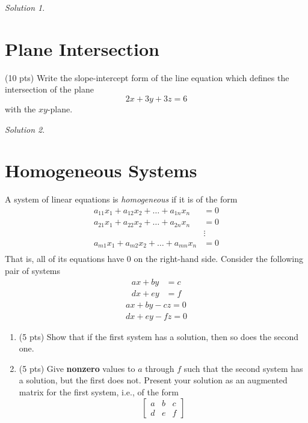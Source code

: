 \documentclass{article}
\theoremstyle{remark}
\newtheorem*{solution}{Solution}
\begin{document}
\begin{solution}
\end{solution}

\pagebreak
\section{Plane Intersection}

(10 pts) Write the slope-intercept form of the line equation which defines the intersection of the plane
\begin{displaymath}
  2x + 3y + 3z = 6
\end{displaymath}
with the $xy$-plane.

\begin{solution}
\end{solution}

\pagebreak
\section{Homogeneous Systems}

A system of linear equations is \textit{homogeneous} if it is of the form
\begin{align*}
  a_{11}x_1 + a_{12}x_2 + \dots + a_{1n}x_n &= 0\\
  a_{21}x_1 + a_{22}x_2 + \dots + a_{2n}x_n &= 0\\
  &\vdots \\
  a_{m1}x_1 + a_{m2}x_2 + \dots + a_{mn}x_n &= 0\\
\end{align*}
That is, all of its equations have $0$ on the right-hand side.
Consider the following pair of systems
\begin{align*}
  ax + by &= c \\
  dx + ey &= f
\end{align*}
\begin{align*}
  ax + by - cz = 0 \\
  dx + ey - fz = 0
\end{align*}
\begin{enumerate}
\item (5 pts) Show that if the first system has a solution, then so does the second one.
\item (5 pts) Give \textbf{nonzero} values to $a$ through $f$ such that the second system has a solution, but the first does not. Present your solution as an augmented matrix for the first system, i.e., of the form
  \begin{displaymath}
    \begin{bmatrix}
      a & b & c \\
      d & e & f
    \end{bmatrix}
  \end{displaymath}
\end{enumerate}
\end{document}
